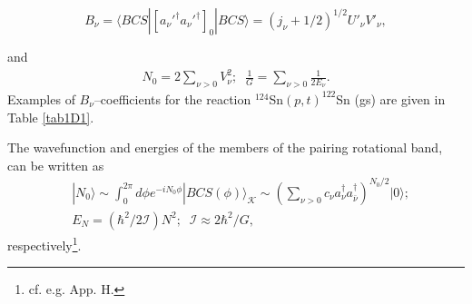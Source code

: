 \begin{equation}
B_\nu=\langle BCS|[a_\nu'^\dagger a_\nu'^\dagger]_0|BCS\rangle=(j_\nu+1/2)^{1/2}U'_\nu V'_\nu,
\end{equation}

and
\begin{equation}
\begin{split} N_0=2\sum_{\nu>0}V^2_\nu;\;\;\frac{1}{G}=\sum_{\nu>0}\frac{1}{2E_\nu}.
\end{split}
\end{equation}
Examples of $B_\nu$--coefficients for the reaction $^{124}$Sn$(p,t)^{122}$Sn (gs) are given in Table \ref{tab1D1}. 


The wavefunction and energies of the members of the pairing rotational band, can be written as  
\begin{equation*}
\begin{split}
&|N_0\rangle\sim\int_0^{2\pi}d\phi e^{-iN_0\phi}|BCS(\phi)\rangle_{\mathcal K}\sim\left(\sum_{\nu>0}c_\nu a_\nu^\dagger a_{\bar{\nu}}^\dagger\right)^{N_0/2}|0\rangle;\\
&E_N=(\hbar^2/2\mathcal{I})N^2 ;\;\;\mathcal{I}\approx 2\hbar^2/G,
\end{split}
\end{equation*}
respectively\footnote{cf. e.g. \cite{Brink:05} App. H.}.

